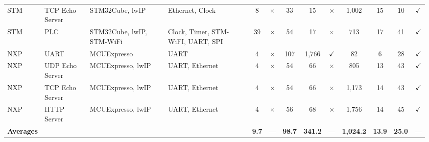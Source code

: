 \begin{table}[p]
\begin{adjustbox}{max width=\textwidth}
\begin{tabular}{@{}llp{2.3cm}p{4.1cm}ccccccccc@{}}
STM & TCP Echo Server & STM32Cube, lwIP & Ethernet, Clock & 8 & $\times$ & 33 & 15 & $\times$ & 1,002 & 15 & 10 & $\checkmark$ \\
STM & PLC & STM32Cube, lwIP, STM-WiFi & Clock, Timer, STM-WiFI, UART, SPI & 39 & $\times$ & 54 & 17 & $\times$ & 713 & 17 & 41 & $\checkmark$ \\
NXP & UART & MCUExpresso & UART & 4 & $\times$ & 107 & 1,766 & $\checkmark$ & 82 & 6 & 28 & $\checkmark$ \\
NXP & UDP Echo Server & MCUExpresso, lwIP & UART, Ethernet & 4 & $\times$ & 54 & 66 & $\times$ & 805 & 13 & 43 & $\checkmark$ \\
NXP & TCP Echo Server & MCUExpresso, lwIP & UART, Ethernet & 4 & $\times$ & 54 & 66 & $\times$ & 1,173 & 14 & 43 & $\checkmark$ \\
NXP & HTTP Server & MCUExpresso, lwIP & UART, Ethernet & 4 & $\times$ & 56 & 68 & $\times$ & 1,756 & 14 & 45 & $\checkmark$ \\
\midrule
\textbf{Averages} &
\multicolumn{1}{l}{} &
\multicolumn{1}{l}{} &
\multicolumn{1}{l}{} &
\textbf{9.7} &
--- &
\textbf{98.7} & \textbf{341.2} &
--- &
\textbf{1,024.2} & \textbf{13.9} & \textbf{25.0} &
--- \\
\bottomrule
\end{tabular}
\end{adjustbox}
\end{table}
